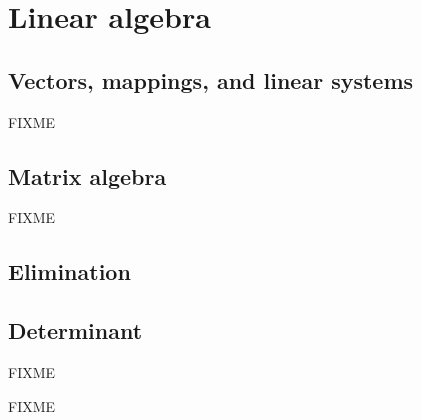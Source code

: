 \chapter{Linear algebra} \label{linalg:appendix}


\section{Vectors, mappings, and linear systems}
\label{vecsandmaps:section}


FIXME


\sectionnewpage
\section{Matrix algebra}
\label{matalg:section}


FIXME


\sectionnewpage
\section{Elimination}
\label{elim:section}



\sectionnewpage
\section{Determinant}
\label{det:section}


FIXME


FIXME
